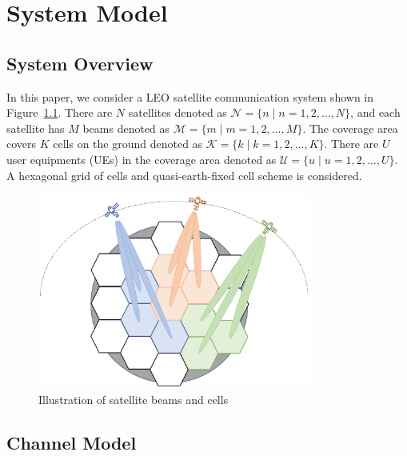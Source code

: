 \chapter{System Model}
\label{chap:model}


\section{System Overview}

In this paper, we consider a LEO satellite communication system shown in Figure~\ref{fig_system}. There are $N$ satellites denoted as $\mathcal{N} = \{n \mid n = 1, 2, \ldots, N\}$, and each satellite has $M$ beams denoted as $\mathcal{M} = \{m \mid m = 1, 2, \ldots, M\}$. The coverage area covers $K$ cells on the ground denoted as $\mathcal{K} = \{k \mid k = 1, 2, \ldots, K\}$. There are $U$ user equipments (UEs) in the coverage area denoted as $\mathcal{U} = \{u \mid u = 1, 2, \ldots, U\}$. A hexagonal grid of cells and quasi-earth-fixed cell scheme is considered.

\begin{figure}[h!]
    \centering
    \includegraphics[width=0.8\textwidth]{figure/system overview.pdf}
    \caption{Illustration of satellite beams and cells}
    \label{fig_system}
\end{figure}

\section{Channel Model}

